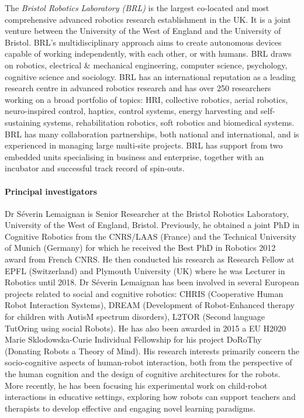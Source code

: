 \documentclass[]{article}
\begin{document}
The \emph{Bristol Robotics Laboratory (BRL)} is the largest co-located
and most comprehensive advanced robotics research establishment in the
UK. It is a joint venture between the University of the West of England
and the University of Bristol. BRL's multidisciplinary approach aims to
create autonomous devices capable of working independently, with each
other, or with humans. BRL draws on robotics, electrical \& mechanical
engineering, computer science, psychology, cognitive science and
sociology. BRL has an international reputation as a leading research
centre in advanced robotics research and has over 250 researchers
working on a broad portfolio of topics: HRI, collective robotics, aerial
robotics, neuro-inspired control, haptics, control systems, energy
harvesting and self-sustaining systems, rehabilitation robotics, soft
robotics and biomedical systems. BRL has many collaboration
partnerships, both national and international, and is experienced in
managing large multi-site projects. BRL has support from two embedded
units specialising in business and enterprise, together with an
incubator and successful track record of spin-outs.

\paragraph{Principal investigators}

Dr Séverin Lemaignan is Senior Researcher at the Bristol Robotics
Laboratory, University of the West of England, Bristol. Previously, he
obtained a joint PhD in Cognitive Robotics from the CNRS/LAAS (France)
and the Technical University of Munich (Germany) for which he received
the Best PhD in Robotics 2012 award from French CNRS. He then conducted
his research as Research Fellow at EPFL (Switzerland) and Plymouth
University (UK) where he was Lecturer in Robotics until 2018. Dr Séverin
Lemaignan has been involved in several European projects related to
social and cognitive robotics: CHRIS (Cooperative Human Robot
Interaction Systems), DREAM (Development of Robot-Enhanced therapy for
children with AutisM spectrum disorders), L2TOR (Second language
TutOring using social Robots). He has also been awarded in 2015 a EU
H2020 Marie Sklodowska-Curie Individual Fellowship for his project
DoRoThy (Donating Robots a Theory of Mind). His research interests
primarily concern the socio-cognitive aspects of human-robot
interaction, both from the perspective of the human cognition and the
design of cognitive architectures for the robots. More recently, he has
been focusing his experimental work on child-robot interactions in
educative settings, exploring how robots can support teachers and
therapists to develop effective and engaging novel learning paradigms.
\end{document}
